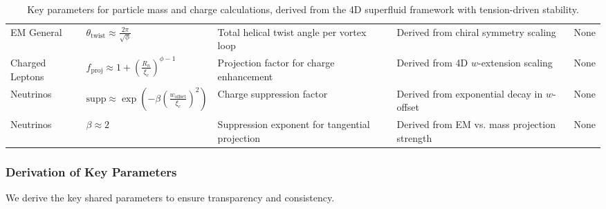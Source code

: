 \begin{sidewaystable}[p]
\begin{tabularx}{\linewidth}{|p{2cm}|p{3cm}|X|X|p{3cm}|}
EM General & $\theta_{\text{twist}} \approx \frac{2\pi}{\sqrt{\phi}}$ & Total helical twist angle per vortex loop & Derived from chiral symmetry scaling & None \\
Charged Leptons & $f_{\text{proj}} \approx 1 + \left(\frac{R_n}{\xi_c}\right)^{\phi - 1}$ & Projection factor for charge enhancement & Derived from 4D $w$-extension scaling & None \\
Neutrinos & $\text{supp} \approx \exp\left( - \beta \left(\frac{w_{\text{offset}}}{\xi_c}\right)^2 \right)$ & Charge suppression factor & Derived from exponential decay in $w$-offset & None \\
Neutrinos & $\beta \approx 2$ & Suppression exponent for tangential projection & Derived from EM vs. mass projection strength & None \\
\hline
\end{tabularx}
\caption{Key parameters for particle mass and charge calculations, derived from the 4D superfluid framework with tension-driven stability.}
\label{tab:variables}
\end{sidewaystable}

\subsubsection{Derivation of Key Parameters}
We derive the key shared parameters to ensure transparency and consistency.

